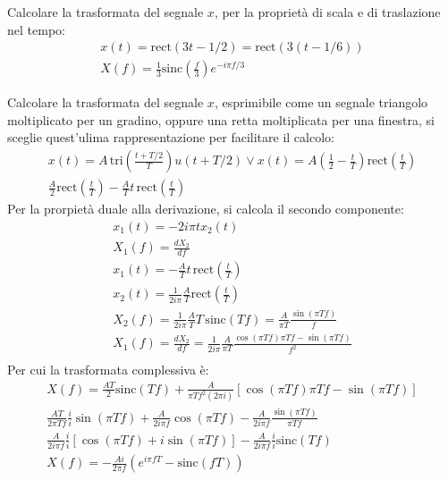 \documentclass{article}
\numberwithin{equation}{subsection}
\begin{document}
Calcolare la trasformata del segnale $x$, per la proprietà di scala e di traslazione nel tempo:
\begin{gather*}
    x(t)=\mbox{rect}(3t-1/2)=\mbox{rect}(3(t-1/6))\\
    X(f)=\displaystyle\frac{1}{3}\mbox{sinc}\left(\frac{f}{3}\right)e^{-i\pi f/3}
\end{gather*}


Calcolare la trasformata del segnale $x$, esprimibile come un segnale triangolo moltiplicato per un gradino, oppure una retta moltiplicata per una finestra, si sceglie 
quest'ulima rappresentazione per facilitare il calcolo:
\begin{gather*}
    x(t)=A\,\displaystyle\mbox{tri}\left(\frac{t+T/2}{T}\right)u(t+T/2)\lor x(t)=A\left(\frac{1}{2}-\frac{t}{T}\right)\mbox{rect}\left(\frac{t}{T}\right)\\
    \displaystyle\frac{A}{2}\mbox{rect}\left(\frac{t}{T}\right)-\frac{A}{T}t\,\mbox{rect}\left(\frac{t}{T}\right)
\end{gather*}
Per la prorpietà duale alla derivazione, si calcola il secondo componente: 
\begin{gather*}
    x_1(t)=-2i\pi tx_2(t)\\
    X_1(f)=\displaystyle\frac{dX_2}{df}\\
    x_1(t)=-\displaystyle\frac{A}{T}t\,\mbox{rect}\left(\frac{t}{T}\right)\\
    x_2(t)=\displaystyle\frac{1}{2i\pi}\frac{A}{T}\mbox{rect}\left(\frac{t}{T}\right)\\
    X_2(f)=\displaystyle\frac{1}{2i\pi}\frac{A}{T}T\,\mbox{sinc}(Tf)=\frac{A}{\pi T}\frac{\sin(\pi Tf)}{f}\\
    X_1(f)=\displaystyle\frac{dX_2}{df}=\frac{1}{2i\pi}\frac{A}{\pi T}\frac{\cos(\pi Tf)\pi Tf-\sin(\pi Tf)}{f^2}\\
\end{gather*}
Per cui la trasformata complessiva è:
\begin{gather*}
    X(f)=\displaystyle\frac{AT}{2}\mbox{sinc}(Tf)+\frac{A}{\pi Tf^2(2\pi i)}\left[\cos(\pi Tf)\pi Tf-\sin (\pi Tf)\right]\\
    \displaystyle\frac{AT}{2\pi Tf}\frac{i}{i}\sin(\pi Tf)+\frac{A}{2i\pi f}\cos(\pi Tf)-\frac{A}{2i\pi f}\frac{\sin(\pi Tf)}{\pi Tf}\\
    \displaystyle\frac{A}{2i\pi f}\frac{i}{i}\left[\cos(\pi Tf)+i\sin(\pi Tf)\right]-\frac{A}{2i\pi f}\frac{i}{i}\mbox{sinc}( Tf)\\
    X(f)=\displaystyle-\frac{Ai}{2\pi f}\left(e^{i\pi fT}-\mbox{sinc}(fT)\right)
\end{gather*}
\end{document}
